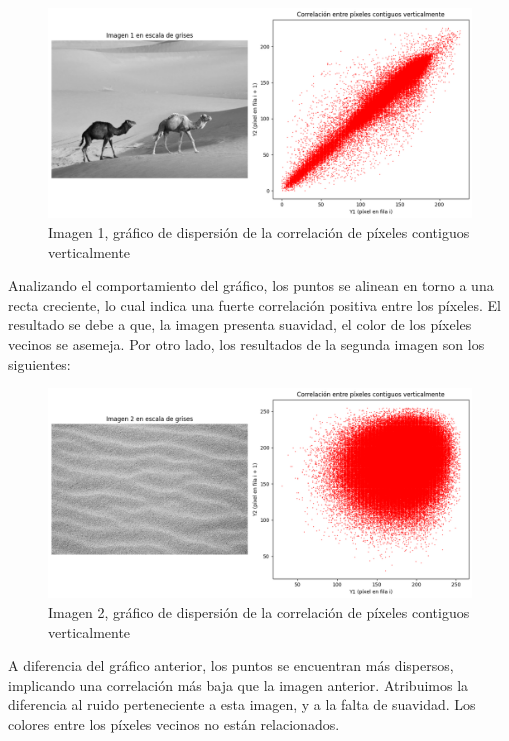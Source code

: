 \documentclass[a4paper,12pt]{article}
\begin{document}
\begin{figure}[H]
    \centering
    \includegraphics[width=1\textwidth]{Ejercicio1a.png}
    \caption{Imagen 1, gráfico de dispersión de la correlación de píxeles contiguos verticalmente}
    \captionsetup{belowskip=0pt}
    \label{fig:correlacion1}
\end{figure}
\vspace{-1em}
Analizando el comportamiento del gráfico, los puntos se alinean en torno a una recta creciente, lo cual indica una fuerte correlación positiva entre los píxeles.
El resultado se debe a que, la imagen presenta suavidad, el color de los píxeles vecinos se asemeja.
Por otro lado, los resultados de la segunda imagen son los siguientes:
\vspace{-1em}
\begin{figure}[H]
    \centering
    \includegraphics[width=1\textwidth]{Ejercicio1b.png}
    \caption{Imagen 2, gráfico de dispersión de la correlación de píxeles contiguos verticalmente}
    \captionsetup{belowskip=0pt}
    \label{fig:correlacion2}
\end{figure}
A diferencia del gráfico anterior, los puntos se encuentran más dispersos, implicando una correlación más baja que la imagen anterior.
Atribuimos la diferencia al ruido perteneciente a esta imagen, y a la falta de suavidad. Los colores entre los píxeles vecinos no están relacionados.
\end{document}

